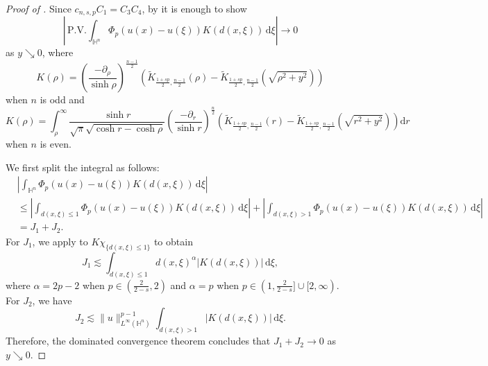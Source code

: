 \documentclass[11pt]{amsart}
\theoremstyle{plain}
\theoremstyle{definition}
\numberwithin{equation}{section}
\begin{document}
\begin{proof} [Proof of ]
Since $c_{n, s, p}C_{1} = C_{3}C_{4}$, by  it is enough to show
\begin{equation*}
\left| \, \mathrm{P.V.}\int_{\mathbb{H}^{n}} \Phi_{p}(u(x)-u(\xi)) K(d(x, \xi)) \,\mathrm{d}\xi \right| \to 0
\end{equation*}
as $y \searrow 0$, where
\begin{equation*}
K(\rho) = \left( \frac{-\partial_{\rho}}{\sinh \rho} \right)^{\frac{n-1}{2}} \left( \widetilde{K}_{\frac{1+sp}{2}, \frac{n-1}{2}}(\rho) - \widetilde{K}_{\frac{1+sp}{2}, \frac{n-1}{2}}\left( \sqrt{\rho^{2}+y^{2}} \right) \right)
\end{equation*}
when $n$ is odd and
\begin{equation*}
K(\rho) = \int_{\rho}^{\infty} \frac{\sinh r}{\sqrt{\pi}\sqrt{\cosh r - \cosh \rho}} \left( \frac{-\partial_{r}}{\sinh r} \right)^{\frac{n}{2}} \left( \widetilde{K}_{\frac{1+sp}{2},\frac{n-1}{2}}(r) - \widetilde{K}_{\frac{1+sp}{2}, \frac{n-1}{2}}\left( \sqrt{r^{2}+y^{2}} \right) \right) \mathrm{d}r
\end{equation*}
when $n$ is even.

We first split the integral as follows:
\begin{equation*}
\begin{split}
&\left| \int_{\mathbb{H}^{n}} \Phi_{p}(u(x)-u(\xi)) K(d(x, \xi)) \,\mathrm{d}\xi \right| \\
&\leq \left| \int_{d(x,\xi) \leq 1} \Phi_{p}(u(x)-u(\xi)) K(d(x, \xi)) \,\mathrm{d}\xi \right| + \left| \int_{d(x,\xi) > 1} \Phi_p(u(x)-u(\xi)) K(d(x, \xi)) \,\mathrm{d}\xi \right| \\
&= J_{1}+J_{2}.
\end{split}
\end{equation*}
For $J_{1}$, we apply  to $K\chi_{\{d(x,\xi)\leq 1\}}$ to obtain
\begin{equation*}
J_{1} \lesssim \int_{d(x, \xi) \leq 1} d(x, \xi)^{\alpha} |K(d(x, \xi))| \,\mathrm{d}\xi,
\end{equation*}
where $\alpha = 2p-2$ when $p \in (\frac{2}{2-s},2)$ and $\alpha = p$ when $p \in (1, \frac{2}{2-s}] \cup [2, \infty)$. For $J_{2}$, we have
\begin{equation*}
J_{2} \lesssim \|u\|_{L^{\infty}(\mathbb{H}^{n})}^{p-1} \int_{d(x, \xi) > 1} |K(d(x, \xi))| \,\mathrm{d}\xi.
\end{equation*}
Therefore, the dominated convergence theorem concludes that $J_{1} + J_{2} \to 0$ as $y \searrow 0$.
\end{proof}
\end{document}
